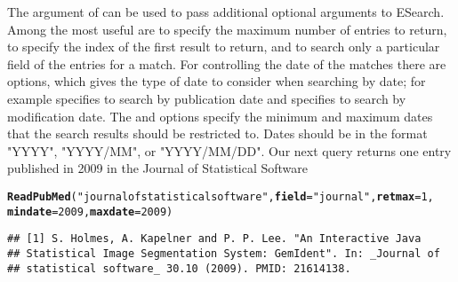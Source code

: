 \documentclass[article]{jss}\usepackage[]{graphicx}\usepackage[]{color}
\makeatletter
\newcommand{\hlnum}[1]{\textcolor[rgb]{0.125,0.125,1}{#1}}%
\newcommand{\hlstr}[1]{\textcolor[rgb]{0.125,0.125,1}{#1}}%
\newcommand{\hlstd}[1]{\textcolor[rgb]{0.251,0.251,0.282}{#1}}%
\newcommand{\hlkwc}[1]{\textcolor[rgb]{0.529,0,0.184}{\textbf{#1}}}%
\newcommand{\hlkwd}[1]{\textcolor[rgb]{0.251,0.251,0.282}{\textbf{#1}}}%
\newenvironment{kframe}{%
 \def\at@end@of@kframe{}%
 \ifinner\ifhmode%
  \def\at@end@of@kframe{\end{minipage}}%
  \begin{minipage}{\columnwidth}%
 \fi\fi%
 \def\FrameCommand##1{\hskip\@totalleftmargin \hskip-\fboxsep
 \colorbox{shadecolor}{##1}\hskip-\fboxsep
     \hskip-\linewidth \hskip-\@totalleftmargin \hskip\columnwidth}%
 \MakeFramed {\advance\hsize-\width
   \@totalleftmargin\z@ \linewidth\hsize
   \@setminipage}}%
 {\par\unskip\endMakeFramed%
 \at@end@of@kframe}
\newenvironment{knitrout}{}{} %
\makeatother
\begin{document}
The  argument of  can be used to pass additional optional arguments to ESearch.  Among the most useful are  to specify the maximum number of entries to return,  to specify the index of the first result to return, and  to search only a particular field of the entries for a match.  For controlling the date of the matches there are options,  which gives the type of date to consider when searching by date; for example  specifies to search by publication date and  specifies to search by modification date.  The  and  options specify the minimum and maximum dates that the search results should be restricted to.  Dates should be in the format "YYYY", "YYYY/MM", or "YYYY/MM/DD".  Our next query returns one entry published in 2009 in the Journal of Statistical Software
\begin{knitrout}
\color{fgcolor}\begin{kframe}
\begin{alltt}
\hlkwd{ReadPubMed}\hlstd{(}\hlstr{"journal of statistical software"}\hlstd{,} \hlkwc{field} \hlstd{=} \hlstr{"journal"}\hlstd{,} \hlkwc{retmax} \hlstd{=} \hlnum{1}\hlstd{,}
    \hlkwc{mindate} \hlstd{=} \hlnum{2009}\hlstd{,} \hlkwc{maxdate} \hlstd{=} \hlnum{2009}\hlstd{)}
\end{alltt}
\begin{verbatim}
## [1] S. Holmes, A. Kapelner and P. P. Lee. "An Interactive Java
## Statistical Image Segmentation System: GemIdent". In: _Journal of
## statistical software_ 30.10 (2009). PMID: 21614138.
\end{verbatim}
\end{kframe}
\end{knitrout}
\end{document}
